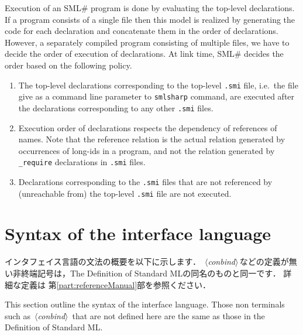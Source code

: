 \documentclass{jbook}
\newcommand{\txt}[2]{#2}
\newcommand{\smlsharp}{SML\#}
\newcommand{\nonterm}[1]{\mbox{$\,\langle$}{\it #1}\mbox{$\rangle\,$}}
\begin{document}
\else%
	Execution of an \smlsharp{} program is done by evaluating the
top-level declarations.
	If a program consists of a single file then this model is
realized by generating the code for each declaration and concatenate
them in the order of declarations.
	However, a separately compiled program consisting of multiple
files, we have to decide the order of execution of declarations.
	At link time, \smlsharp{} decides the order based on the
following policy.
\begin{enumerate}
\item
	The top-level declarations corresponding to the top-level {\tt .smi} file,
i.e.\ the file give as a command line parameter to {\tt smlsharp} command, are
executed after the declarations corresponding to any other {\tt .smi} files.

\item
	Execution order of declarations respects the dependency of
references of names.
	Note that the reference relation is the actual relation
generated by occurrences of long-ids in a program, and not the 
relation generated by {\tt\_require} declarations in {\tt .smi} files.
\item
	Declarations corresponding to the {\tt .smi} files 
that are not referenced by (unreachable from) the top-level {\tt .smi}
file are not executed.
\end{enumerate}

\fi%

\section{\txt{インタフェイス言語の文法}{Syntax of the interface language}}
\label{sec:tutorialInterfaceSyntax}

\ifjp%
	インタフェイス言語の文法の概要を以下に示します．
	\nonterm{conbind}などの定義が無い非終端記号は，The Definition of
Standard MLの同名のものと同一です．
	詳細な定義は
第\ref{part:referenceManual}部を参照ください．

\else%
	This section outline the syntax of the interface language.
	Those non terminals such as \nonterm{conbind} that are not
defined here are the same as those in the Definition of Standard ML.
\fi%
\end{document}
